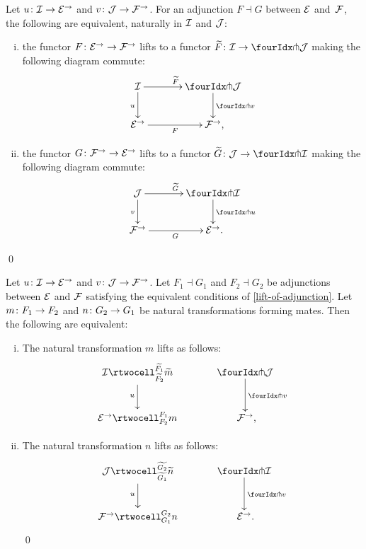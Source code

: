 \documentclass[reqno,10pt,a4paper,oneside,draft]{amsart}
\begin{document}
{{\begin{proposition} \label{lift-of-adjunction}
Let $u \co \cal{I} \to \catE^\to$ and $v \co \cal{J} \to \cal{F}^\to$.
For an adjunction $F \dashv G$ between $\cal{E}$ and~$\cal{F}$, the following are equivalent, naturally in $\cal{I}$ and $\cal{J}$:
\begin{enumerate}[(i)]
\item the functor $F \co \catE^\to \to \cal{F}^\to$ lifts to a functor $\widetilde{F} \co \cal{I} \to \liftl{\cal{J}}$ making the following diagram commute:
\[
\xymatrix@C=1.2cm{
  \cal{I}
  \ar[r]^{\widetilde{F}}
  \ar[d]_{u}
&
  \liftl{\cal{J}}
  \ar[d]^{\liftl{v}}
\\
  \catE^\to
  \ar[r]_-{F}
&
  \cal{F}^\to
\rlap{,}}
\]
\item the functor $G \co \cal{F}^\to \to \catE^\to$ lifts to a functor $\widetilde{G} \co \cal{J} \to \liftr{\cal{I}}$ making the following diagram commute:
\[
\xymatrix@C=1.2cm{
  \cal{J}
  \ar[d]_{v}
  \ar[r]^{\widetilde{G}}
&
  \liftr{\cal{I}}
  \ar[d]^{\liftr{u}}
\\
  \cal{F}^\to
  \ar[r]_{G}
&
  \catE^\to
\rlap{.}  }
\]
\end{enumerate}
\qed
\end{proposition}

\begin{proposition} \label{lift-of-mates}
Let $u \co \cal{I} \to \catE^\to$ and $v \co \cal{J} \to \cal{F}^\to$.
Let $F_1 \dashv G_1$ and $F_2 \dashv G_2$ be adjunctions between $\cal{E}$ and $\cal{F}$ satisfying the equivalent conditions of \cref{lift-of-adjunction}.
Let $m \co F_1 \to F_2$ and $n \co G_2 \to G_1$ be natural transformations forming mates.
Then the following are equivalent:
\begin{enumerate}[(i)]
\item
The natural transformation $m$ lifts as follows:
\[
\xymatrix@C=1.2cm{
  \cal{I}
  \rtwocell_{\widetilde{F_2}}^{\widetilde{F_1}}{\widetilde{m}}
  \ar[d]_{u}
&
  \liftl{\cal{J}}
  \ar[d]^{\liftl{v}}
\\
  \catE^\to
  \rtwocell_{F_2}^{F_1}{m}
&
  \cal{F}^\to
\rlap{,}}
\]
\item
The natural transformation $n$ lifts as follows:
\[
\xymatrix@C=1.2cm{
  \cal{J}
  \rtwocell_{\widetilde{G_1}}^{\widetilde{G_2}}{\widetilde{n}}
  \ar[d]_{u}
&
  \liftr{\cal{I}}
  \ar[d]^{\liftl{v}}
\\
  \cal{F}^\to
  \rtwocell_{G_1}^{G_2}{n}
&
  \cal{E}^\to
\rlap{.}}
\]
\qed
\end{enumerate}
\end{proposition}

}}
\end{document}

